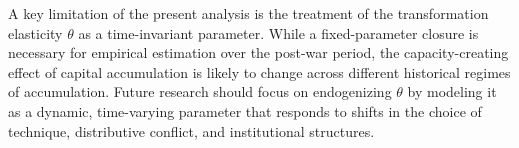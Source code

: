 \documentclass[11pt]{article}
\begin{document}
A key limitation of the present analysis is the treatment of the transformation elasticity $\theta$ as a time-invariant parameter. While a fixed-parameter closure is necessary for empirical estimation over the post-war period, the capacity-creating effect of capital accumulation is likely to change across different historical regimes of accumulation. Future research should focus on endogenizing $\theta$ by modeling it as a dynamic, time-varying parameter that responds to shifts in the choice of technique, distributive conflict, and institutional structures.

\pagebreak


\pagebreak
\appendix

\pagebreak

\end{document}
